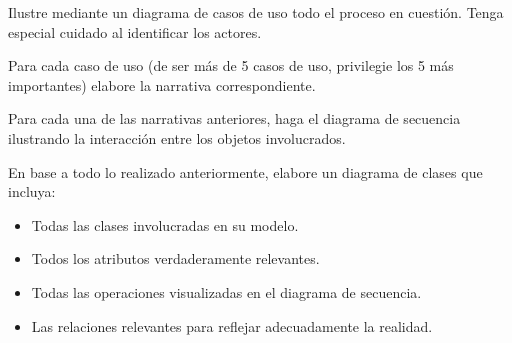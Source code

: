 \documentclass[11pt]{article}
\begin{document}
\begin{spacing}{1.2}
\begin{Problem}
\begin{ProbPart}[difficulty={10}]
Ilustre mediante un diagrama de casos de uso todo el proceso en cuestión. Tenga especial
cuidado al identificar los actores.

\end{ProbPart}

\begin{ProbPart}[difficulty={30}]

Para cada caso de uso (de ser más de 5 casos de uso, privilegie los 5 más importantes)
elabore la narrativa correspondiente.

\end{ProbPart}

\begin{ProbPart}[difficulty={30}]

Para cada una de las narrativas anteriores, haga el diagrama de secuencia ilustrando la interacción entre los objetos involucrados.

\end{ProbPart}

\begin{ProbPart}[difficulty={30}]

En base a todo lo realizado anteriormente, elabore un diagrama de clases que incluya:

\begin{itemize}[topsep=0pt]
    \item Todas las clases involucradas en su modelo.
    \item Todos los atributos verdaderamente relevantes.
    \item Todas las operaciones visualizadas en el diagrama de secuencia.
    \item Las relaciones relevantes para reflejar adecuadamente la realidad.
\end{itemize}

\end{ProbPart}
\end{Problem}

\begin{NewAnswer}
\end{NewAnswer}

\end{spacing}
\end{document}
